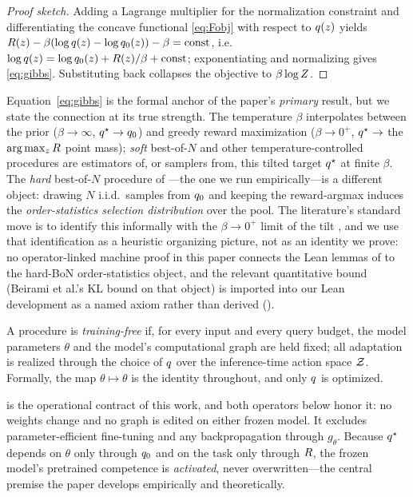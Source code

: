 \begin{proof}[Proof sketch]
Adding a Lagrange multiplier for the normalization constraint and differentiating the concave functional \eqref{eq:Fobj} with respect to $q(z)$ yields $R(z) - \beta(\log q(z) - \log q_{0}(z)) - \beta = \text{const}$, i.e. $\log q(z) = \log q_{0}(z) + R(z)/\beta + \text{const}$; exponentiating and normalizing gives \eqref{eq:gibbs}. Substituting back collapses the objective to $\beta\log Z$.
\end{proof}

Equation~\eqref{eq:gibbs} is the formal anchor of the paper's \emph{primary} result, but we state the connection at its true strength. The temperature $\beta$ interpolates between the prior ($\beta\to\infty$, $q^{\star}\to q_{0}$) and greedy reward maximization ($\beta\to 0^+$, $q^{\star}\to$ the $\arg\max_z R$ point mass); \emph{soft} best-of-$N$ and other temperature-controlled procedures \citep{beirami2024bon,verdun2025softbon,khalaf2025hedgetune} are estimators of, or samplers from, this tilted target $q^{\star}$ at finite $\beta$. The \emph{hard} best-of-$N$ procedure of ---the one we run empirically---is a different object: drawing $N$ i.i.d.\ samples from $q_{0}$ and keeping the reward-argmax induces the \emph{order-statistics selection distribution} over the pool. The literature's standard move is to identify this informally with the $\beta\to 0^+$ limit of the tilt \citep{beirami2024bon}, and we use that identification as a heuristic organizing picture, not as an identity we prove: no operator-linked machine proof in this paper connects the Lean lemmas of  to the hard-BoN order-statistics object, and the relevant quantitative bound (Beirami et al.'s KL bound on that object) is imported into our Lean development as a named axiom rather than derived ().

\begin{definition}
\label{def:invariant}
A procedure is \emph{training-free} if, for every input and every query budget, the model parameters $\theta$ and the model's computational graph are held fixed; all adaptation is realized through the choice of $q$ over the inference-time action space $\mathcal{Z}$. Formally, the map $\theta \mapsto \theta$ is the identity throughout, and only $q$ is optimized.
\end{definition}

 is the operational contract of this work, and both operators below honor it: no weights change and no graph is edited on either frozen model. It excludes parameter-efficient fine-tuning and any backpropagation through $g_\theta$. Because $q^{\star}$ depends on $\theta$ only through $q_{0}$ and on the task only through $R$, the frozen model's pretrained competence is \emph{activated}, never overwritten---the central premise the paper develops empirically and theoretically.

